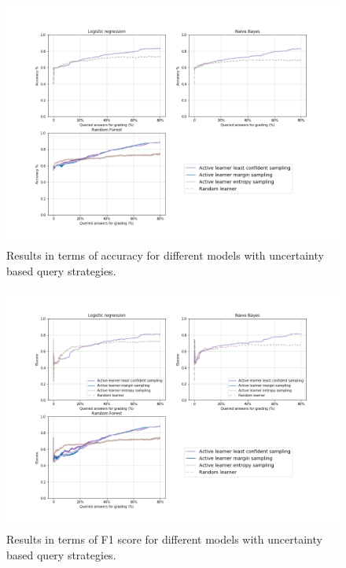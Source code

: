 \begin{figure}[!htb]
	\centering
	\includegraphics[scale=0.46]{images/binary/task9_accuracy_uncertainty}
	\caption{Results in terms of accuracy for different models with uncertainty based query strategies.}
	\label{t9_b_uncertainty}
\end{figure}

\begin{figure}[!htb]
	\centering
	\includegraphics[scale=0.46]{images/binary/task9_f1score_uncertainty}
	\caption{Results in terms of F1 score for different models with uncertainty based query strategies.}
	\label{t9_b_uncertainty_f1}
\end{figure}


